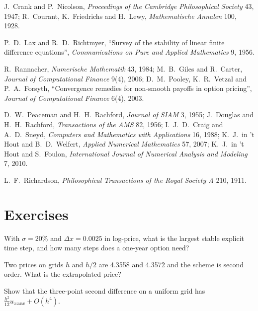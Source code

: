 \begin{omsources}
\item J.~Crank and P.~Nicolson, \emph{Proceedings of the Cambridge Philosophical Society} 43, 1947; R.~Courant, K.~Friedrichs and H.~Lewy, \emph{Mathematische Annalen} 100, 1928.
\item P.~D.~Lax and R.~D.~Richtmyer, ``Survey of the stability of linear finite difference equations'', \emph{Communications on Pure and Applied Mathematics} 9, 1956.
\item R.~Rannacher, \emph{Numerische Mathematik} 43, 1984; M.~B.~Giles and R.~Carter, \emph{Journal of Computational Finance} 9(4), 2006; D.~M.~Pooley, K.~R.~Vetzal and P.~A.~Forsyth, ``Convergence remedies
for non-smooth payoffs in option pricing'', \emph{Journal of Computational Finance} 6(4), 2003.
\item D.~W.~Peaceman and H.~H.~Rachford, \emph{Journal of SIAM} 3, 1955; J.~Douglas and H.~H.~Rachford, \emph{Transactions of the AMS} 82, 1956; I.~J.~D.~Craig and A.~D.~Sneyd, \emph{Computers and
Mathematics with Applications} 16, 1988; K.~J.~in 't Hout and B.~D.~Welfert, \emph{Applied Numerical Mathematics} 57, 2007; K.~J.~in 't Hout and S.~Foulon, \emph{International Journal of Numerical Analysis and Modeling} 7, 2010.
\item L.~F.~Richardson, \emph{Philosophical Transactions of the Royal Society A} 210, 1911.
\end{omsources}

\section{Exercises}

\begin{exercise}[$\star$]\label{exo:qm:finite-difference-methods:1}
With $\sigma = 20\%$ and $\Delta x = 0.0025$ in log-price, what is the largest stable explicit time step, and how many steps does a one-year option need?
\end{exercise}

\begin{exercise}[$\star$]\label{exo:qm:finite-difference-methods:2}
Two prices on grids $h$ and $h/2$ are 4.3558 and 4.3572 and the scheme is second order. What is the extrapolated price?
\end{exercise}

\begin{exercise}[$\star$]\label{exo:qm:finite-difference-methods:3}
Show that the three-point second difference on a uniform grid has  $\frac{h^2}{12}u_{xxxx} + O(h^4)$.
\end{exercise}


